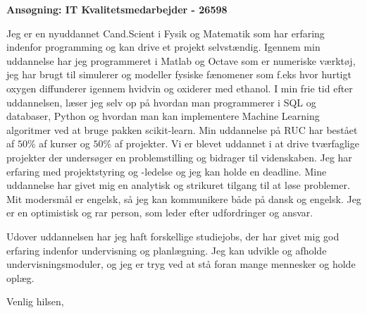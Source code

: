 \documentclass[10pt,a4paper]{letter}
\begin{document}
\begin{letter}{}
\opening{\textbf{Ansøgning: IT Kvalitetsmedarbejder - 26598}}

Jeg er en nyuddannet Cand.Scient i Fysik og Matematik som har erfaring indenfor programming og kan drive et projekt selvstændig. Igennem min uddannelse har jeg programmeret i Matlab og Octave som er numeriske værktøj, jeg har brugt til simulerer og modeller fysiske fænomener som f.eks hvor hurtigt oxygen diffunderer igennem hvidvin og oxiderer med ethanol. I min frie tid efter uddannelsen, læser jeg selv op på hvordan man programmerer i SQL og databaser, Python og hvordan man kan implementere Machine Learning algoritmer ved at bruge pakken scikit-learn. Min uddannelse på RUC har bestået af $50\%$ af kurser og $50\%$ af projekter. Vi er blevet uddannet i at drive tværfaglige projekter der undersøger en problemstilling og bidrager til videnskaben. Jeg har erfaring med projektstyring og -ledelse og jeg kan holde en deadline. Mine uddannelse har givet mig en analytisk og strikuret tilgang til at løse problemer. Mit modersmål er engelsk, så jeg kan kommunikere både på dansk og engelsk. Jeg er en optimistisk og rar person, som leder efter udfordringer og ansvar.   
 

Udover uddannelsen har jeg haft forskellige studiejobs, der har givet mig god erfaring indenfor undervisning og planlægning. Jeg kan udvikle og afholde undervisningsmoduler, og jeg er tryg ved at stå foran mange mennesker og holde oplæg.
\closing{Venlig hilsen,}

\end{letter}
\end{document}
